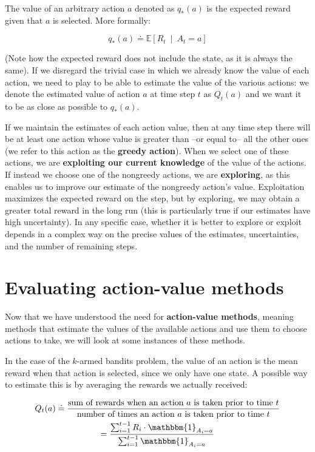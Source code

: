 The value of an arbitrary action $a$ denoted as $q_*(a)$ is the expected reward given that $a$ is selected. More formally:

\begin{equation*}
    q_*(a) \doteq \mathbb{E} \left[ R_t \  \middle\vert \  A_t = a \right]
\end{equation*}

(Note how the expected reward does not include the state, as it is always the same). If we disregard the trivial case in which we already know the value of each action, we need to play to be able to estimate the value of the various actions: we denote the estimated value of action $a$ at time step $t$ as $Q_t(a)$ and we want it to be as close as possible to $q_*(a)$.

If we maintain the estimates of each action value, then at any time step there will be at least one action whose value is greater than --or equal to-- all the other ones (we refer to this action as the \textbf{greedy action}). When we select one of these actions, we are \textbf{exploiting our current knowledge} of the value of the actions. If instead we choose one of the nongreedy actions, we are \textbf{exploring}, as this enables us to improve our estimate of the nongreedy action’s value. Exploitation maximizes the expected reward on the step, but by exploring, we may obtain a greater total reward in the long run (this is particularly true if our estimates have high uncertainty). In any specific case, whether it is better to explore or exploit depends in a complex way on the precise values of the estimates, uncertainties, and the number of remaining steps.

\section{Evaluating action-value methods}
Now that we have understood the need for \textbf{action-value methods}, meaning methods that estimate the values of the available actions and use them to choose actions to take, we will look at some instances of these methods.

In the case of the $k$-armed bandits problem, the value of an action is the mean reward when that action is selected, since we only have one state. A possible way to estimate this is by averaging the rewards we actually received:

\begin{gather}
    Q_t(a) \doteq \frac{\text{sum of rewards when an action } a \text{ is taken prior to time } t}{\text{number of times an action } a \text{ is taken prior to time } t}\nonumber\\
    = \frac{\sum_{i=1}^{t-1} R_i \cdot \mathbbm{1}_{A_i = a}}{\sum_{i=1}^{t-1} \mathbbm{1}_{A_i = a}}
    \label{eq:ch3-sampleaveragemethod}
\end{gather}

